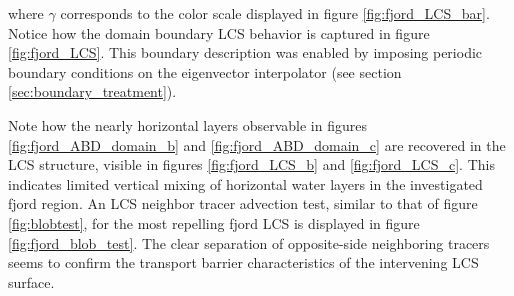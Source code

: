 \noindent where $\gamma$ corresponds to the color scale displayed in figure \ref{fig:fjord_LCS_bar}. Notice how the domain boundary LCS behavior is captured in figure \ref{fig:fjord_LCS}. This boundary description was enabled by imposing periodic boundary conditions on the eigenvector interpolator (see section \ref{sec:boundary_treatment}). 

Note how the nearly horizontal layers observable in figures \ref{fig:fjord_ABD_domain_b} and \ref{fig:fjord_ABD_domain_c} are recovered in the LCS structure, visible in figures \ref{fig:fjord_LCS_b} and \ref{fig:fjord_LCS_c}. This indicates limited vertical mixing of horizontal water layers in the investigated fjord region. An LCS neighbor tracer advection test, similar to that of figure \ref{fig:blobtest}, for the most repelling fjord LCS is displayed in figure \ref{fig:fjord_blob_test}. The clear separation of opposite-side neighboring tracers seems to confirm the transport barrier characteristics of the intervening LCS surface.


